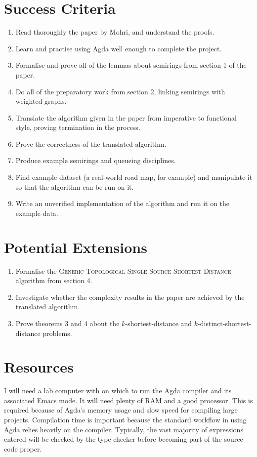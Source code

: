 \section*{Success Criteria}
\begin{enumerate}
  \item
    Read thoroughly the paper by Mohri, and understand the proofs.
  \item
    Learn and practise using Agda well enough to complete the project.
  \item
    Formalise and prove all of the lemmas about semirings from section 1 of the paper.
  \item
    Do all of the preparatory work from section 2, linking semirings with weighted graphs.
  \item
    Translate the algorithm given in the paper from imperative to functional style, proving termination in the process.
  \item
    Prove the correctness of the translated algorithm.
  \item
    Produce example semirings and queueing disciplines.
  \item
    Find example dataset (a real-world road map, for example) and manipulate it so that the algorithm can be run on it.
  \item
    Write an unverified implementation of the algorithm and run it on the example data.
\end{enumerate}

\section*{Potential Extensions}
\begin{enumerate}
  \item
    Formalise the \textsc{Generic-Topological-Single-Source-Shortest-Distance} algorithm from section 4.
  \item
    Investigate whether the complexity results in the paper are achieved by the translated algorithm.
  \item
    Prove theorems 3 and 4 about the $k$-shortest-distance and $k$-distinct-shortest-distance problems.
\end{enumerate}

\section*{Resources}
I will need a lab computer with on which to run the Agda compiler and its associated Emacs mode.
It will need plenty of RAM and a good processor.
This is required because of Agda's memory usage and slow speed for compiling large projects.
Compilation time is important because the standard workflow in using Agda relies heavily on the compiler.
Typically, the vast majority of expressions entered will be checked by the type checker before becoming part of the source code proper.

